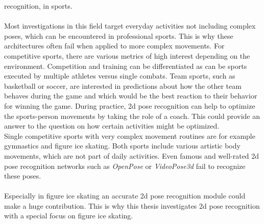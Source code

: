 recognition, in sports.
\\\mbox{}\\
Most investigations in this field target everyday activities not including complex poses, which can be encountered in
professional sports.
This is why these architectures often fail when applied to more complex movements.
For competitive sports, there are various metrics of high interest depending on the environment.
Competition and training can be differentiated as can be sports executed by multiple athletes versus single combats.
Team sports, such as basketball or soccer, are interested in predictions about
how the other team behaves during the game and which would be the best reaction to their behavior for winning
the game.
During practice, 2d pose recognition can help to optimize the sports-person movements by taking the role of a coach.
This could provide an answer to the question on how certain activities might be optimized. \\
Single competitive sports with very complex movement routines are for example gymnastics and figure ice skating.
Both sports include various artistic body movements, which are not part of daily activities.
Even famous and well-rated 2d pose recognition networks such as \textit{OpenPose} or \textit{VideoPose3d} fail to recognize these
poses.
\\\mbox{}\\
Especially in figure ice skating an accurate 2d pose recognition module could make a huge contribution.
This is why this thesis investigates 2d pose recognition with a special focus on figure ice skating.
%




